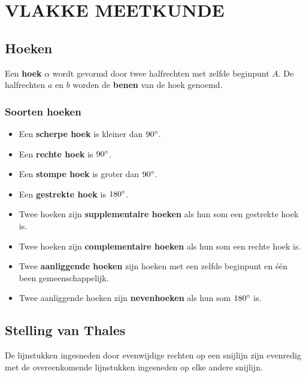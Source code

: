 \section{VLAKKE MEETKUNDE} \label{vlakke meetkunde}
\hypertarget{vlakke_meetkunde}{}

\subsection{Hoeken} \label{hoeken}
\hypertarget{hoeken}{}

\begin{minipage}{0.2\linewidth}
\end{minipage}
\begin{minipage}{0.8\linewidth}
Een {\bf hoek} $\alpha$ wordt gevormd door twee halfrechten met zelfde beginpunt $A$. De halfrechten $a$ en $b$ worden de {\bf benen} van de hoek genoemd.
\end{minipage}


\subsubsection{Soorten hoeken}
\begin{itemize}
  \item Een {\bf scherpe hoek} is kleiner dan $90^\circ$.
  \item Een {\bf rechte hoek} is $90^\circ$.
  \item Een {\bf stompe hoek} is groter dan $90^\circ$.
  \item Een {\bf gestrekte hoek} is $180^\circ$.
  \item Twee hoeken zijn {\bf supplementaire hoeken} als hun som een gestrekte hoek is.
  \item Twee hoeken zijn {\bf complementaire hoeken} als hun som een rechte hoek is.
  \item Twee {\bf aanliggende hoeken} zijn hoeken met een zelfde beginpunt en één been gemeenschappelijk.
  \item Twee aanliggende hoeken zijn {\bf nevenhoeken} als hun som $180^\circ$ is.
\end{itemize}

\subsection{Stelling van Thales} \label{thales}
\hypertarget{thales}{}
De lijnstukken ingesneden door evenwijdige rechten op een snijlijn zijn evenredig met de overeenkomende lijnstukken ingesneden op elke andere snijlijn.

